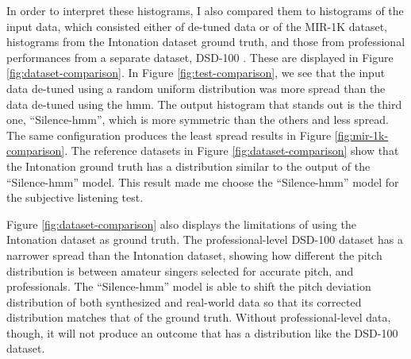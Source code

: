 In order to interpret these histograms, I also compared them to histograms of the input data, which consisted either of de-tuned data or of the MIR-1K dataset, histograms from the Intonation dataset ground truth, and those from professional performances from a separate dataset, DSD-100 \cite{SiSEC16}. These are displayed in Figure \ref{fig:dataset-comparison}. In Figure \ref{fig:test-comparison}, we see that the input data de-tuned using a random uniform distribution was more spread than the data de-tuned using the \gls{hmm}. The output histogram that stands out is the third one, ``Silence-\gls{hmm}'', which is more symmetric than the others and less spread. The same configuration produces the least spread results in Figure \ref{fig:mir-1k-comparison}. The reference datasets in Figure \ref{fig:dataset-comparison} show that the Intonation ground truth has a distribution similar to the output of the ``Silence-\gls{hmm}'' model. This result made me choose the ``Silence-\gls{hmm}'' model for the subjective listening test.

Figure \ref{fig:dataset-comparison} also displays the limitations of using the Intonation dataset as ground truth. The professional-level DSD-100 dataset has a narrower spread than the Intonation dataset, showing how different the pitch distribution is between amateur singers selected for accurate pitch, and professionals. The ``Silence-\gls{hmm}'' model is able to shift the pitch deviation distribution of both synthesized and real-world data so that its corrected distribution matches that of the ground truth. Without professional-level data, though, it will not produce an outcome that has a distribution like the DSD-100 dataset.

